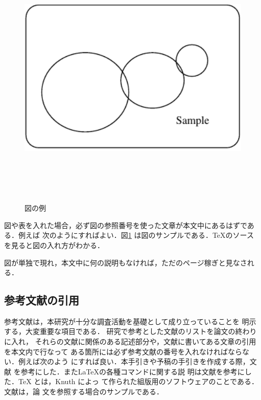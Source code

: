 \documentclass{jsarticle}
\begin{document}
\begin{figure}[htbp]
  \begin{center}
     \includegraphics[width=13cm,height=12cm,keepaspectratio]{figure.pdf}\\
  \end{center}
  \caption{図の例}%
\label{fig1}
\end{figure}

図や表を入れた場合，必ず図の参照番号を使った文章が本文中にあるはずである．例えば
次のようにすればよい．図\ref{fig1} は図のサンプルである．\TeX のソース
を見ると図の入れ方がわかる．

図が単独で現れ，本文中に何の説明もなければ，ただのページ稼ぎと見なされ
る．

\subsection{参考文献の引用}
参考文献は，本研究が十分な調査活動を基礎として成り立っていることを
明示する，大変重要な項目である．
研究で参考とした文献のリストを論文の終わりに入れ，
それらの文献に関係のある記述部分や，文献に書いてある文章の引用を本文内で行なって
ある箇所には必ず参考文献の番号を入れなければならない．例えば次のよう
にすれば良い．本手引きや予稿の手引きを作成する際，文献
\cite{kinosita}を参考にした．また\LaTeX の各種コマンドに関する説
明は文献\cite{okumura}を参考にした．\TeX \cite{knuth} とは，Knuth によっ
て作られた組版用のソフトウェアのことである．文献\cite{labelName}は，論
文を参照する場合のサンプルである．
\end{document}
